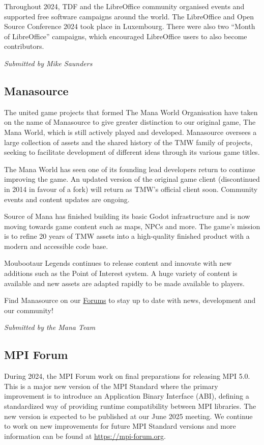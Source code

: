 \documentclass[a4paper]{report}
\begin{document}
Throughout 2024, TDF and the LibreOffice community organised events and supported free software campaigns around the world. The LibreOffice and Open Source Conference 2024 took place in Luxembourg. There were also two ``Month of LibreOffice'' campaigns, which encouraged LibreOffice users to also become contributors.

{\em Submitted by Mike Saunders}

\subsection{Manasource}

The united game projects that formed The Mana World Organisation have taken on the name of Manasource to give greater distinction to our original game, The Mana World, which is still actively played and developed. Manasource oversees a large collection of assets and the shared history of the TMW family of projects, seeking to facilitate development of different ideas through its various game titles.

The Mana World has seen one of its founding lead developers return to continue improving the game. An updated version of the original game client (discontinued in 2014 in favour of a fork) will return as TMW's official client soon. Community events and content updates are ongoing.

Source of Mana has finished building its basic Godot infrastructure and is now moving towards game content such as maps, NPCs and more. The game's mission is to refine 20 years of TMW assets into a high-quality finished product with a modern and accessible code base.

Moubootaur Legends continues to release content and innovate with new additions such as the Point of Interest system. A huge variety of content is available and new assets are adapted rapidly to be made available to players.

Find Manasource on our \href{https://forums.themanaworld.org/}{Forums} to stay up to date with news, development and our community!

{\em Submitted by the Mana Team}

\subsection{MPI Forum}

During 2024, the MPI Forum work on final preparations for releasing MPI 5.0. This is a major new version of the MPI Standard where the primary improvement is to introduce an Application Binary Interface (ABI), defining a standardized way of providing runtime compatibility between MPI libraries. The new version is expected to be published at our June 2025 meeting. We continue to work on new improvements for future MPI Standard versions and more information can be found at \href{https://mpi-forum.org}{https://mpi-forum.org}.
\end{document}
